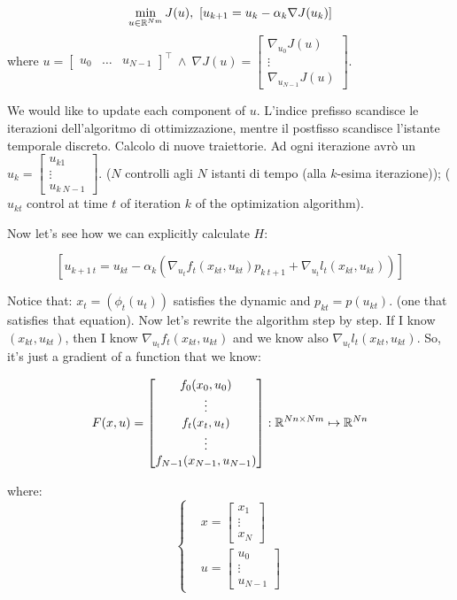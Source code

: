 \[
	\min_{u\in\mathbb{R}^{Nm}}{J(u)},\ [u_{k+1} = u_k -\alpha_k\nabla{J(u_k)}]
\]
where $u = \begin{bmatrix}u_0&\dots&u_{N-1}\end{bmatrix}^\top\ \land\ \nabla{J(u)} = \begin{bmatrix}\nabla_{u_0}{J(u)}\\ \vdots\\ \nabla_{u_{N-1}}{J(u)}\end{bmatrix}$.

We would like to update each component of $u$. L'indice prefisso scandisce le iterazioni dell'algoritmo di ottimizzazione, mentre il postfisso scandisce l'istante temporale discreto. Calcolo di nuove traiettorie. Ad ogni iterazione avrò un $u_k=\begin{bmatrix}u_{k1}\\ \vdots\\u_{k\ N-1}\end{bmatrix}$. ($N$ controlli agli $N$ istanti di tempo (alla $k$-esima iterazione)); ($u_{kt}$ control at time $t$ of iteration $k$ of the optimization algorithm).

Now let's see how we can explicitly calculate $H$:

\[
	[u_{k+1\ t} = u_{kt} - \alpha_k(\nabla_{u_t}{f_t(x_{kt}, u_{kt})}p_{k\ t+1} + \nabla_{u_t}{l_t(x_{kt}, u_{kt})})]
\]	

Notice that: $x_t=(\phi_t(u_t))$ satisfies the dynamic and $p_{kt} = p(u_{kt})$. (one that satisfies that equation). Now let's rewrite the algorithm step by step. If I know $(x_{kt},u_{kt})$, then I know $\nabla_{u_t}{f_t(x_{kt},u_{kt})}$ and we know also $\nabla_{u_t}{l_t(x_{kt},u_{kt})}$. So, it's just a gradient of a function that we know:

\[
	F(x,u) = \begin{bmatrix}f_0(x_0,u_0)\\ \vdots\\f_t(x_t,u_t)\\ \vdots\\f_{N-1}(x_{N-1},u_{N-1})\end{bmatrix} : \mathbb{R}^{Nn\times Nm}\mapsto\mathbb{R}^{Nn}
\]

where:
\[
	\left\{
	\begin{aligned}
	&x = \begin{bmatrix}x_1\\ \vdots\\x_N\end{bmatrix}\\
	&u = \begin{bmatrix}u_0\\ \vdots\\u_{N-1}\end{bmatrix}
	\end{aligned}
	\right.
\]

